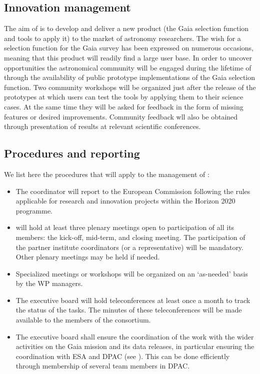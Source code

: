 \subsection{Innovation management}
\label{sec:innovationmgmt}

The aim of {\acro} is to develop and deliver a new product (the Gaia selection function and tools to apply it) to the market of astronomy researchers. The wish for a selection function for the Gaia survey has been expressed on numerous occasions, meaning that this product will readily find a large user base. In order to uncover opportunities the astronomical community will be engaged during the lifetime of {\acro} through the availability of public prototype implementations of the Gaia selection function. Two community workshops will be organized just after the release of the prototypes at which users can test the tools by applying them to their science cases. At the same time they will be asked for feedback in the form of missing features or desired improvements. Community feedback wll also be obtained through presentation of {\acro} results at relevant scientific conferences.

\subsection{Procedures and reporting}
\label{sec:procedures}

We list here the procedures that will apply to the management of {\acro}:
\begin{itemize}
    \item The {\acro} coordinator will report to the European Commission following the rules applicable for research and innovation projects within the Horizon 2020 programme.
    \item {\acro} will hold at least three plenary meetings open to participation of all its members: the kick-off, mid-term, and closing meeting. The participation of the partner institute coordinators (or a representative) will be mandatory. Other plenary meetings may be held if needed.
    \item Specialized meetings or workshops will be organized on an `as-needed' basis by the WP managers.
    \item The executive board will hold teleconferences at least once a month to track the status of the tasks. The minutes of these teleconferences will be made available to the members of the consortium.
    \item The executive board shall ensure the coordination of the {\acro} work with the wider activities on the Gaia mission and its data releases, in particular ensuring the coordination with ESA and DPAC (see ). This can be done efficiently through membership of several {\acro} team members in DPAC.
\end{itemize}

